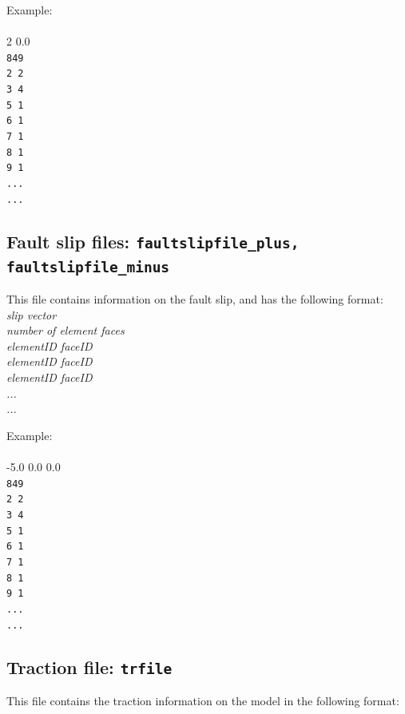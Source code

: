 Example:\\
\\
2 0.0\\
\texttt{849\\
2 2\\
3 4\\
5 1\\
6 1\\
7 1\\
8 1\\
9 1\\
...\\
...}\\

\subsection{Fault slip files: \texttt{faultslipfile\_plus, faultslipfile\_minus}}

This file contains information on the fault slip, and has the following format:\\
\emph{slip vector}\\
\emph{number of element faces}\\
\emph{elementID faceID \\
elementID faceID \\
elementID faceID \\
...\\
...\\}

Example:\\
\\
-5.0 0.0 0.0\\
\texttt{849\\
2 2\\
3 4\\
5 1\\
6 1\\
7 1\\
8 1\\
9 1\\
...\\
...}\\

\subsection{Traction file: \texttt{trfile}}

This file contains the traction information on the model in the following format:\\

